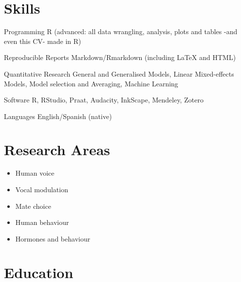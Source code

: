 \documentclass[11pt, a4paper]{awesome-cv}
\providecommand{\tightlist}{%
	\setlength{\itemsep}{0pt}\setlength{\parskip}{0pt}}
\begin{document}
\hypertarget{skills}{%
\section{Skills}\label{skills}}

\begin{cvskills}
  \cvskill
    {Programming}
    {R (advanced: all data wrangling, analysis, plots and tables -and even this CV- made in R)}

  \cvskill
    {Reproducible Reports}
    {Markdown/Rmarkdown (including {\selectfont\LaTeX} and HTML)}

  \cvskill
    {Quantitative Research}
    {General and Generalised Models, Linear Mixed-effects Models, Model selection and Averaging, Machine Learning}

  \cvskill
    {Software}
    {R, RStudio, Praat, Audacity, InkScape, Mendeley, Zotero}

  \cvskill
    {Languages}
    {English/Spanish (native)}
\end{cvskills}

\hypertarget{research-areas}{%
\section{Research Areas}\label{research-areas}}

\begin{itemize}
\tightlist
\item
  Human voice
\item
  Vocal modulation
\item
  Mate choice
\item
  Human behaviour
\item
  Hormones and behaviour
\end{itemize}

\hypertarget{education}{%
\section{Education}\label{education}}
\end{document}
